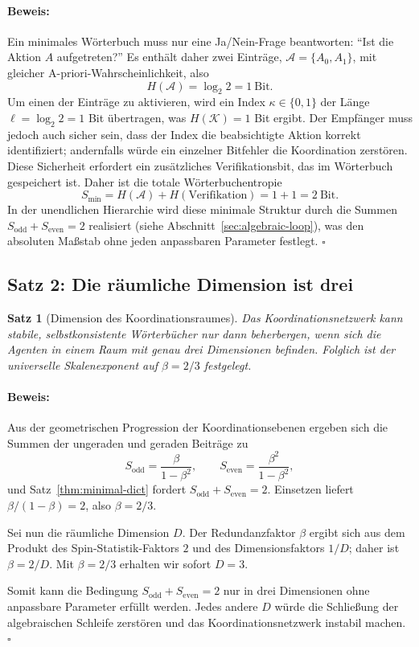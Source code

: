 \documentclass[12pt,a4paper]{article}
\newtheorem{theorem}{Satz}[section]
\theoremstyle{remark}
\renewenvironment{proof}{\paragraph{Beweis:}}{\hfill$\square$}
\begin{document}
	\begin{proof}
		Ein minimales Wörterbuch muss nur eine Ja/Nein-Frage beantworten: ``Ist die
		Aktion \(A\) aufgetreten?'' Es enthält daher zwei Einträge,
		\(\mathcal{A} = \{A_0, A_1\}\), mit gleicher A-priori-Wahrscheinlichkeit, also
		\[
		H(\mathcal{A}) = \log_2 2 = 1\ \text{Bit}.
		\]
		Um einen der Einträge zu aktivieren, wird ein Index \(\kappa \in \{0,1\}\)
		der Länge \(\ell = \log_2 2 = 1\) Bit übertragen, was \(H(\mathcal{K}) = 1\) Bit
		ergibt. Der Empfänger muss jedoch auch sicher sein, dass der Index die
		beabsichtigte Aktion korrekt identifiziert; andernfalls würde ein einzelner
		Bitfehler die Koordination zerstören. Diese Sicherheit erfordert ein
		zusätzliches Verifikationsbit, das im Wörterbuch gespeichert ist. Daher ist
		die totale Wörterbuchentropie
		\[
		S_{\min} = H(\mathcal{A}) + H(\text{Verifikation}) = 1 + 1 = 2\ \text{Bit}.
		\]
		In der unendlichen Hierarchie wird diese minimale Struktur durch die Summen
		\(S_{\mathrm{odd}} + S_{\mathrm{even}} = 2\) realisiert (siehe
		Abschnitt~\ref{sec:algebraic-loop}), was den absoluten Maßstab ohne jeden
		anpassbaren Parameter festlegt.
	\end{proof}
	
	\subsection{Satz 2: Die räumliche Dimension ist drei}
	
	\begin{theorem}[Dimension des Koordinationsraumes]
		\label{thm:dimension}
		Das Koordinationsnetzwerk kann stabile, selbstkonsistente Wörterbücher nur
		dann beherbergen, wenn sich die Agenten in einem Raum mit genau drei
		Dimensionen befinden. Folglich ist der universelle Skalenexponent auf
		\(\beta = 2/3\) festgelegt.
	\end{theorem}
	
	\begin{proof}
		Aus der geometrischen Progression der Koordinationsebenen ergeben sich die
		Summen der ungeraden und geraden Beiträge zu
		\[
		S_{\mathrm{odd}} = \frac{\beta}{1-\beta^2}, \qquad
		S_{\mathrm{even}} = \frac{\beta^2}{1-\beta^2},
		\]
		und Satz~\ref{thm:minimal-dict} fordert
		\(S_{\mathrm{odd}} + S_{\mathrm{even}} = 2\).
		Einsetzen liefert \(\beta/(1-\beta) = 2\), also \(\beta = 2/3\).
		
		Sei nun die räumliche Dimension \(D\). Der Redundanzfaktor \(\beta\) ergibt
		sich aus dem Produkt des Spin-Statistik-Faktors \(2\) und des
		Dimensionsfaktors \(1/D\); daher ist \(\beta = 2/D\). Mit \(\beta = 2/3\)
		erhalten wir sofort \(D = 3\).
		
		Somit kann die Bedingung \(S_{\mathrm{odd}} + S_{\mathrm{even}} = 2\) nur
		in drei Dimensionen ohne anpassbare Parameter erfüllt werden. Jedes andere
		\(D\) würde die Schließung der algebraischen Schleife zerstören und das
		Koordinationsnetzwerk instabil machen.
	\end{proof}
	
\end{document}
